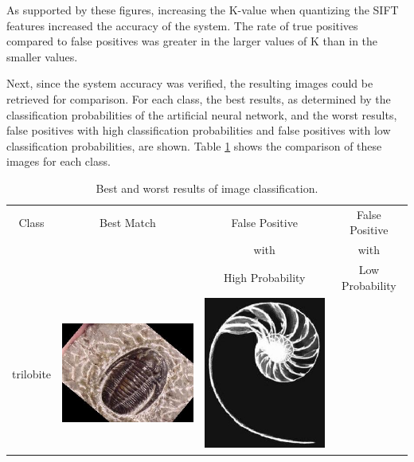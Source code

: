 \documentclass{article}
\begin{document}
As supported by these figures, increasing the K-value when quantizing the SIFT features increased the accuracy of the system. The rate of true positives compared to false positives was greater in the larger values of K than in the smaller values.

Next, since the system accuracy was verified, the resulting images could be retrieved for comparison. For each class, the best results, as determined by the classification probabilities of the artificial neural network, and the worst results, false positives with high classification probabilities and false positives with low classification probabilities, are shown. Table \ref{tab:results} shows the comparison of these images for each class.

\begin{table}[Ht]
\caption{Best and worst results of image classification.}
\label{tab:results}
\begin{tabular}{| c | c | c | c |}
\hline
Class & Best Match & False Positive & False Positive \\
 & & with & with \\
 & & High Probability & Low Probability \\
\hline
trilobite &
\vspace{0cm}\includegraphics[scale=.1]{"Figures/Best Matches/bestmatch_c1"} &
\vspace{0cm}\includegraphics[scale=.1]{"Figures/False Matches/class_1_most_sure_wrong"} &

\end{tabular}
\end{table}
\end{document}
